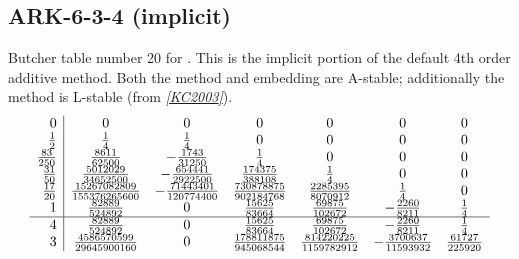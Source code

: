 \documentclass[letterpaper,10pt,english]{sphinxmanual}
\begin{document}
\subsection{ARK-6-3-4 (implicit)}
\label{Butcher:ark-6-3-4-implicit}\label{Butcher:butcher-ark-6-3-4-i}
Butcher table number 20
for {\hyperref[c_interface/User_callable:c.ARKodeSetIRKTableNum]{\emph{}}}.  This is
the implicit portion of the default 4th order additive method.  Both
the method and embedding are A-stable; additionally the method is
L-stable (from \label{Butcher:id19}{\hyperref[References:kc2003]{\emph{{[}KC2003{]}}}}).
\begin{gather}
\begin{split}\begin{array}{r|cccccc}
  0 & 0 & 0 & 0 & 0 & 0 & 0 \\
  \frac{1}{2} & \frac{1}{4} & \frac{1}{4} & 0 & 0 & 0 & 0 \\
  \frac{83}{250} & \frac{8611}{62500} & -\frac{1743}{31250} & \frac{1}{4} & 0 & 0 & 0 \\
  \frac{31}{50} & \frac{5012029}{34652500} & -\frac{654441}{2922500} & \frac{174375}{388108} & \frac{1}{4} & 0 & 0 \\
  \frac{17}{20} & \frac{15267082809}{155376265600} & -\frac{71443401}{120774400} & \frac{730878875}{902184768} & \frac{2285395}{8070912} & \frac{1}{4} & 0 \\
  1 & \frac{82889}{524892} & 0 & \frac{15625}{83664} & \frac{69875}{102672} & -\frac{2260}{8211} & \frac{1}{4} \\
  \hline
  4 & \frac{82889}{524892} & 0 & \frac{15625}{83664} & \frac{69875}{102672} & -\frac{2260}{8211} & \frac{1}{4} \\
  3 & \frac{4586570599}{29645900160} & 0 & \frac{178811875}{945068544} & \frac{814220225}{1159782912} & -\frac{3700637}{11593932} & \frac{61727}{225920}
\end{array}\end{split}\notag
\end{gather}\begin{figure}[htbp]
\centering
\capstart


\end{figure}
\end{document}
